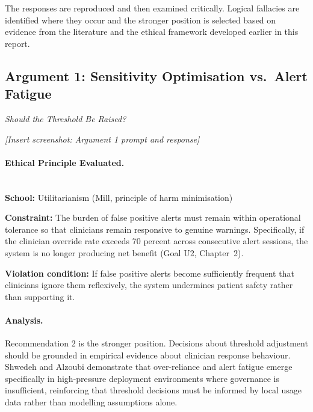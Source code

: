 \documentclass[]{UCD_CS_41820_Report}
\begin{document}
The responses are reproduced and then examined critically. Logical fallacies are
identified where they occur and the stronger position is selected based on evidence
from the literature and the ethical framework developed earlier in this report.

\subsection*{Argument 1: Sensitivity Optimisation vs.\ Alert Fatigue}
\textit{Should the Threshold Be Raised?}

\noindent\textit{[Insert screenshot: Argument 1 prompt and response]}

\paragraph{Ethical Principle Evaluated.}~\\

\textbf{School:} Utilitarianism (Mill, principle of harm minimisation)

\textbf{Constraint:} The burden of false positive alerts must remain within
operational tolerance so that clinicians remain responsive to genuine warnings.
Specifically, if the clinician override rate exceeds 70 percent across consecutive
alert sessions, the system is no longer producing net benefit (Goal U2, Chapter~2).

\textbf{Violation condition:} If false positive alerts become sufficiently frequent
that clinicians ignore them reflexively, the system undermines patient safety rather
than supporting it.

\paragraph{Analysis.}

Recommendation 2 is the stronger position. Decisions about threshold adjustment
should be grounded in empirical evidence about clinician response behaviour.
Shwedeh and Alzoubi \cite{shwedeh2025} demonstrate that over-reliance and alert
fatigue emerge specifically in high-pressure deployment environments where governance
is insufficient, reinforcing that threshold decisions must be informed by local usage
data rather than modelling assumptions alone.
\end{document}
